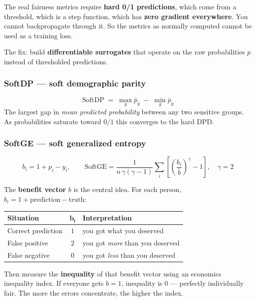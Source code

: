 \documentclass[11pt,a4paper]{article}
\begin{document}
The real fairness metrics require \textbf{hard 0/1 predictions}, which come
from a threshold, which is a step function, which has \textbf{zero gradient
everywhere}. You cannot backpropagate through it. So the metrics as normally
computed cannot be used as a training loss.

The fix: build \textbf{differentiable surrogates} that operate on the raw
probabilities $p$ instead of thresholded predictions.

\subsubsection{SoftDP --- soft demographic parity}
\begin{equation}
\mathrm{SoftDP} \;=\; \max_g \bar{p}_g \;-\; \min_g \bar{p}_g
\end{equation}
The largest gap in \emph{mean predicted probability} between any two sensitive
groups. As probabilities saturate toward $0/1$ this converges to the hard DPD.

\subsubsection{SoftGE --- soft generalized entropy}
\begin{equation}
b_i = 1 + p_i - y_i, \qquad
\mathrm{SoftGE} = \frac{1}{n\,\gamma(\gamma-1)}\sum_i
\left[\left(\frac{b_i}{\bar b}\right)^{\!\gamma} - 1\right],
\quad \gamma = 2
\end{equation}

The \textbf{benefit vector} $b$ is the central idea. For each person,
$b_i = 1 + \text{prediction} - \text{truth}$:

\begin{center}
\small
\begin{tabular}{@{}lcl@{}}
\toprule
\textbf{Situation} & $\boldsymbol{b_i}$ & \textbf{Interpretation} \\
\midrule
Correct prediction & $1$ & you got what you deserved \\
False positive     & $2$ & you got \emph{more} than you deserved \\
False negative     & $0$ & you got \emph{less} than you deserved \\
\bottomrule
\end{tabular}
\end{center}

Then measure the \textbf{inequality} of that benefit vector using an economics
inequality index. If everyone gets $b=1$, inequality is $0$ --- perfectly
individually fair. The more the errors concentrate, the higher the index.
\end{document}
